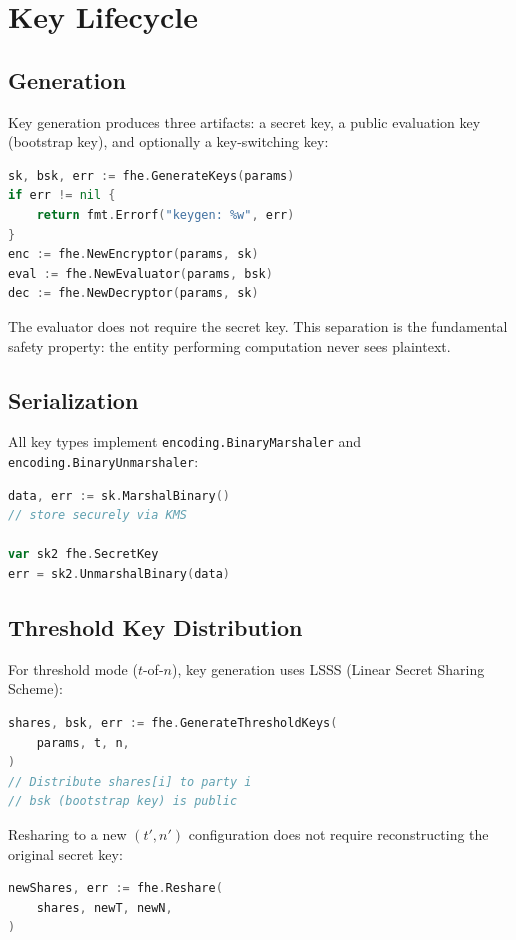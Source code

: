 \section{Key Lifecycle}


\subsection{Generation}

Key generation produces three artifacts: a secret key, a public evaluation key (bootstrap key), and optionally a key-switching key:

\begin{lstlisting}[language=Go]
sk, bsk, err := fhe.GenerateKeys(params)
if err != nil {
    return fmt.Errorf("keygen: %w", err)
}
enc := fhe.NewEncryptor(params, sk)
eval := fhe.NewEvaluator(params, bsk)
dec := fhe.NewDecryptor(params, sk)
\end{lstlisting}

The evaluator does not require the secret key. This separation is the fundamental safety property: the entity performing computation never sees plaintext.

\subsection{Serialization}

All key types implement \texttt{encoding.BinaryMarshaler} and \texttt{encoding.BinaryUnmarshaler}:

\begin{lstlisting}[language=Go]
data, err := sk.MarshalBinary()
// store securely via KMS

var sk2 fhe.SecretKey
err = sk2.UnmarshalBinary(data)
\end{lstlisting}

\subsection{Threshold Key Distribution}

For threshold mode ($t$-of-$n$), key generation uses LSSS (Linear Secret Sharing Scheme):

\begin{lstlisting}[language=Go]
shares, bsk, err := fhe.GenerateThresholdKeys(
    params, t, n,
)
// Distribute shares[i] to party i
// bsk (bootstrap key) is public
\end{lstlisting}

Resharing to a new $(t', n')$ configuration does not require reconstructing the original secret key:

\begin{lstlisting}[language=Go]
newShares, err := fhe.Reshare(
    shares, newT, newN,
)
\end{lstlisting}

